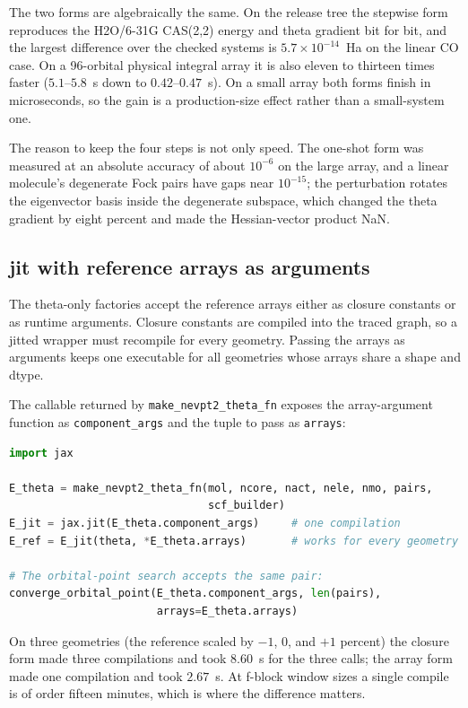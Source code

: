 The two forms are algebraically the same.  On the release tree the
stepwise form reproduces the H2O/6-31G CAS(2,2) energy and theta
gradient bit for bit, and the largest difference over the checked
systems is $5.7\times10^{-14}$~Ha on the linear CO case.  On a
96-orbital physical integral array it is also eleven to thirteen times
faster ($5.1$--$5.8$~s down to $0.42$--$0.47$~s).  On a small array
both forms finish in microseconds, so the gain is a production-size
effect rather than a small-system one.

The reason to keep the four steps is not only speed.  The one-shot
form was measured at an absolute accuracy of about $10^{-6}$ on the
large array, and a linear molecule's degenerate Fock pairs have gaps
near $10^{-15}$; the perturbation rotates the eigenvector basis inside
the degenerate subspace, which changed the theta gradient by eight
percent and made the Hessian-vector product NaN.

\subsection{jit with reference arrays as arguments}

The theta-only factories accept the reference arrays either as closure
constants or as runtime arguments.  Closure constants are compiled
into the traced graph, so a jitted wrapper must recompile for every
geometry.  Passing the arrays as arguments keeps one executable for
all geometries whose arrays share a shape and dtype.

The callable returned by \texttt{make\_nevpt2\_theta\_fn} exposes the
array-argument function as \texttt{component\_args} and the tuple to
pass as \texttt{arrays}:

\begin{lstlisting}[language=Python]
import jax

E_theta = make_nevpt2_theta_fn(mol, ncore, nact, nele, nmo, pairs,
                               scf_builder)
E_jit = jax.jit(E_theta.component_args)     # one compilation
E_ref = E_jit(theta, *E_theta.arrays)       # works for every geometry

# The orbital-point search accepts the same pair:
converge_orbital_point(E_theta.component_args, len(pairs),
                       arrays=E_theta.arrays)
\end{lstlisting}

On three geometries (the reference scaled by $-1$, $0$, and $+1$
percent) the closure form made three compilations and took $8.60$~s
for the three calls; the array form made one compilation and took
$2.67$~s.  At f-block window sizes a single compile is of order
fifteen minutes, which is where the difference matters.

